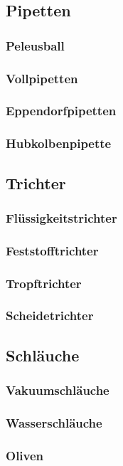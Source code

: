 \subsection{Pipetten}
\subsubsection{Peleusball}
\subsubsection{Vollpipetten}
\subsubsection{Eppendorfpipetten}
\subsubsection{Hubkolbenpipette}

\subsection{Trichter}
\subsubsection{Flüssigkeitstrichter}
\subsubsection{Feststofftrichter}
\subsubsection{Tropftrichter}
\subsubsection{Scheidetrichter}

\subsection{Schläuche}
\subsubsection{Vakuumschläuche}
\subsubsection{Wasserschläuche}
\subsubsection{Oliven}

